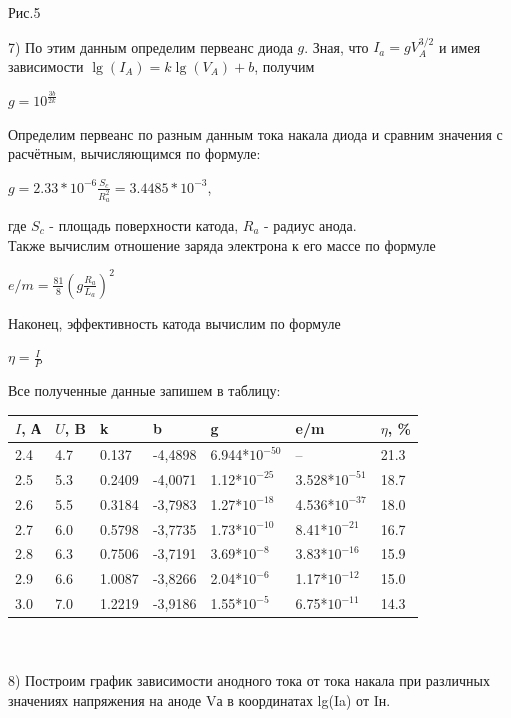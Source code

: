 \documentclass[11pt]{article}
\begin{document}
\begin{center}
Рис.5
\end{center}
7) По этим данным определим первеанс диода $g$. Зная, что $I_a = gV_A^{3/2}$ и имея зависимости $\lg(I_A) = k \lg(V_A) + b$, получим
\begin{center}
    $g = 10^{\frac{3b}{2k}}$
\end{center}
Определим первеанс по разным данным тока накала диода и сравним значения с расчётным, вычисляющимся по формуле:\\
\begin{center}
    $g = 2.33*10^{-6} \frac{S_c}{R_a ^2} = 3.4485*10^{-3}$,
\end{center}
где $S_c$ - площадь поверхности катода, $R_a$ - радиус анода. \\
Также вычислим отношение заряда электрона к его массе по формуле
\begin{center}
   $e/m = \frac{81}{8}(g\frac{R_a}{L_a})^2$
\end{center}
Наконец, эффективность катода вычислим по формуле
\begin{center}
    $\eta = \frac{I}{P}$
\end{center}
Все полученные данные запишем в таблицу:\\
    \begin{tabular}{ |p{1cm}|p{1cm}|p{1cm}|p{2cm}|p{2cm}|p{2cm}|p{2cm}|}
 \hline
 $I$, А & $U$, B & k & b & g & e/m & $\eta$, \% \\
 \hline
2.4 & 4.7 & 0.137 & -4,4898 & 6.944*$10^{-50}$ & -- & 21.3\\
 \hline
2.5 & 5.3 & 0.2409 & -4,0071 & 1.12*$10^{-25}$ & 3.528*$10^{-51}$ & 18.7\\
 \hline
2.6 & 5.5 & 0.3184 & -3,7983 & 1.27*$10^{-18}$ & 4.536*$10^{-37}$ & 18.0\\
 \hline
2.7 & 6.0 & 0.5798 & -3,7735 & 1.73*$10^{-10}$ & 8.41*$10^{-21}$ & 16.7\\
 \hline
2.8 & 6.3 & 0.7506 & -3,7191 & 3.69*$10^{-8}$ & 3.83*$10^{-16}$ & 15.9 \\
 \hline
2.9 & 6.6 & 1.0087 & -3,8266 & 2.04*$10^{-6}$ & 1.17*$10^{-12}$ & 15.0\\
 \hline
3.0 & 7.0 & 1.2219 & -3,9186 & 1.55*$10^{-5}$ & 6.75*$10^{-11}$ & 14.3\\
 \hline 
\end{tabular}\\
\\
8) Построим график зависимости анодного тока от тока накала при различных значениях напряжения на аноде Vа в координатах lg(Ia) от Iн.\\
\end{document}
